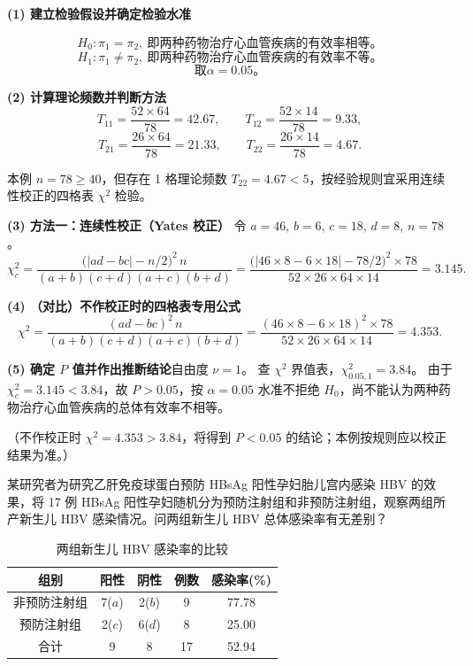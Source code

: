 \documentclass[lang=cn,10pt]{elegantbook}
\begin{document}
\begin{solution}
\textbf{(1) 建立检验假设并确定检验水准}

\[
  H_0:\pi_1=\pi_2,~即两种药物治疗心血管疾病的有效率相等。
\]
\[
H_1:\pi_1\ne\pi_2,~即两种药物治疗心血管疾病的有效率不等。
\]
\[
取 \alpha=0.05。
\]

\textbf{(2) 计算理论频数并判断方法}\quad
\[
  T_{11}=\frac{52\times 64}{78}=42.67,\qquad T_{12}=\frac{52\times 14}{78}=9.33,
\]
\[
  T_{21}=\frac{26\times 64}{78}=21.33,\qquad T_{22}=\frac{26\times 14}{78}=4.67.
\]

本例 $n=78\ge 40$，但存在 1 格理论频数 $T_{22}=4.67<5$，按经验规则宜采用连续性校正的四格表 $\chi^2$ 检验。

\textbf{(3) 方法一：连续性校正（Yates 校正）}\quad
令 $a=46,\,b=6,\,c=18,\,d=8,\,n=78$。
\[
  \chi_c^2=\frac{\bigl(|ad-bc|-n/2\bigr)^2\,n}{(a+b)(c+d)(a+c)(b+d)}
  =\frac{\bigl(|46\times 8-6\times 18|-78/2\bigr)^2\times 78}{52\times 26\times 64\times 14}=3.145.
\]

\textbf{(4) （对比）不作校正时的四格表专用公式}\quad
\[
  \chi^2=\frac{(ad-bc)^2\,n}{(a+b)(c+d)(a+c)(b+d)}
  =\frac{(46\times 8-6\times 18)^2\times 78}{52\times 26\times 64\times 14}=4.353.
\]

\textbf{(5) 确定 $P$ 值并作出推断结论}\quad 自由度 $\nu=1$。
查 $\chi^2$ 界值表，$\chi^2_{0.05,1}=3.84$。
由于 $\chi_c^2=3.145<3.84$，故 $P>0.05$，按 $\alpha=0.05$ 水准不拒绝 $H_0$，尚不能认为两种药物治疗心血管疾病的总体有效率不相等。

（不作校正时 $\chi^2=4.353>3.84$，将得到 $P<0.05$ 的结论；本例按规则应以校正结果为准。）
\end{solution}

\vspace{0.2cm}
\begin{exercise}
某研究者为研究乙肝免疫球蛋白预防 HBsAg 阳性孕妇胎儿宫内感染 HBV 的效果，将 17 例 HBsAg 阳性孕妇随机分为预防注射组和非预防注射组，观察两组所产新生儿 HBV 感染情况。问两组新生儿 HBV 总体感染率有无差别？

\begin{table}[htbp]
\centering
\caption*{两组新生儿 HBV 感染率的比较}
\begin{tabular}{ccccc}
  \hline
  组别 & 阳性 & 阴性 & 例数 & 感染率(\%) \\
  \hline
  非预防注射组 & 7($a$) & 2($b$) & 9 & 77.78 \\
  预防注射组   & 2($c$) & 6($d$) & 8 & 25.00 \\
  \hline
  合计 & 9 & 8 & 17 & 52.94 \\
  \hline
\end{tabular}
\end{table}
\end{exercise}
\end{document}
